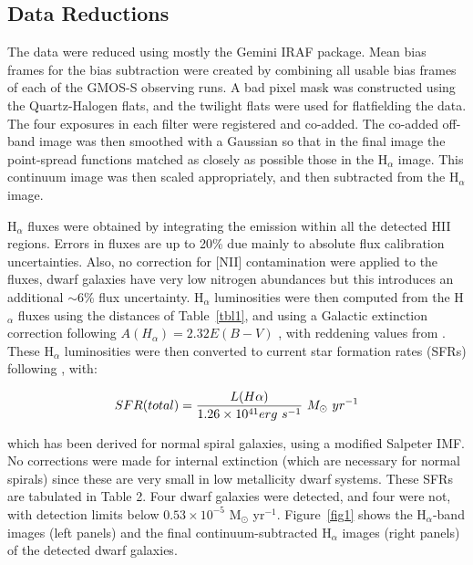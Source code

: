 \documentclass[12pt,preprint]{emulateapj}
\begin{document}
\subsection{Data Reductions}

The data were reduced using mostly the Gemini IRAF package. Mean bias frames for the bias subtraction were created by combining all usable bias 
frames of each of the GMOS-S observing runs. A bad pixel mask was constructed using the Quartz-Halogen flats, and the twilight flats were used for 
flatfielding the data. The four exposures in each filter were registered and co-added. The co-added off-band image was then smoothed with a Gaussian 
so that in the final image the point-spread functions matched as closely as possible those in the H$_\alpha$ image. This continuum image was then scaled 
appropriately, and then subtracted from the H$_\alpha$ image. 

H$_\alpha$ fluxes were obtained by integrating the emission within all the detected HII regions. Errors in fluxes are up to 20\% due mainly to absolute 
flux calibration uncertainties. Also, no correction for [NII] contamination were applied to the fluxes, dwarf galaxies have very low nitrogen abundances
\cite[see, e.g.,][]{scm03b} but this introduces an additional $\sim $6\% flux uncertainty. H$_\alpha$ luminosities were then computed from the H$_\alpha$ 
fluxes using the distances of Table~\ref{tbl1}, and using a Galactic extinction correction following $A(H_\alpha ) = 2.32 E(B-V)$ \citep{mh94}, with reddening values 
from \cite{sfd98}. These H$_\alpha$ luminosities were then converted to current star formation rates (SFRs) following \cite{ktc94}, with:

\begin{equation}
SFR(total) = {{L(H\alpha )}\over{1.26\times 10^{41} erg\  s^{-1}}}\
M_\odot\  yr^{-1}
\end{equation}

which has been derived for normal spiral galaxies, using a modified Salpeter IMF.  No corrections were made for internal extinction (which are necessary 
for normal spirals) since these are very small in low metallicity dwarf systems. These SFRs are tabulated in Table 2.
Four dwarf galaxies were detected, and four were not, with detection limits below $0.53\times 10^{-5}$ M$_{\odot}$ yr$^{-1}$.
Figure~\ref{fig1} shows the H$_\alpha$-band images (left panels) and the final continuum-subtracted H$_\alpha$ images (right panels) of the detected 
dwarf galaxies. 
\end{document}
